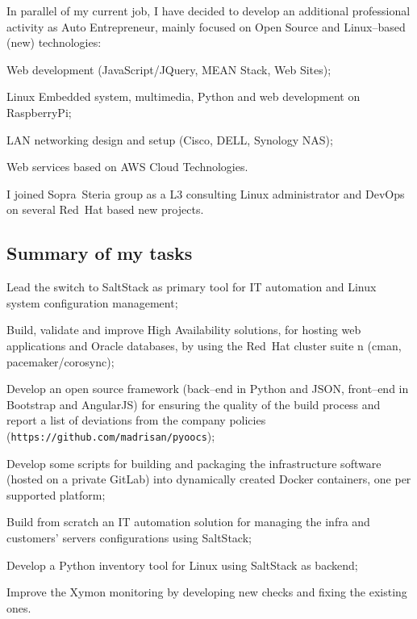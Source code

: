 

In parallel of my current job, I have decided to develop an additional professional
activity as Auto Entrepreneur, mainly focused on Open Source and Linux--based (new) technologies:

\item{\bdot} Web development (JavaScript/JQuery, MEAN Stack, Web Sites);
\item{\bdot} Linux Embedded system, multimedia, Python and web development on RaspberryPi;
\item{\bdot} LAN networking design and setup (Cisco, DELL, Synology NAS);
\item{\bdot} Web services based on AWS Cloud Technologies.



I joined Sopra~Steria group as a L3 consulting Linux administrator and DevOps on
several Red~Hat based new projects.

\subsection{Summary of my tasks}

\item{\bdot} Lead the switch to SaltStack as primary tool for IT automation and Linux
   system configuration management;
\item{\bdot} Build, validate and improve High Availability solutions,
   for hosting web applications and Oracle databases, by using the Red~Hat cluster suite
n   (cman, pacemaker/corosync);
\item{\bdot} Develop an open source framework (back--end in Python and JSON, front--end in
   Bootstrap and AngularJS) for ensuring the quality of the build process and report
   a list of deviations from the company policies
   ({\tt https://github.com/madrisan/pyoocs});
\item{\bdot} Develop some scripts for building and packaging the infrastructure software
   (hosted on a private GitLab) into dynamically created Docker containers,
   one per supported platform;
\item{\bdot} Build from scratch an IT automation solution for managing the infra and
   customers' servers configurations using SaltStack;
\item{\bdot} Develop a Python inventory tool for Linux using SaltStack as backend;
\item{\bdot} Improve the Xymon monitoring by developing new checks and fixing the
   existing ones.


